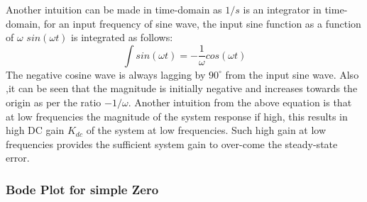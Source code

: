 Another intuition can be made in time-domain as $1/s$ is an integrator in time-domain, for an input frequency of sine wave, the input sine function as a function of $\omega$ $sin(\omega t)$ is integrated as follows:
\begin{equation}
\int sin(\omega t) = -\frac{1}{\omega} cos(\omega t)
\end{equation}
The negative cosine wave is always lagging by $90^{\circ}$ from the input sine wave. Also ,it can be seen that the magnitude is initially negative and increases towards the origin as per the ratio $-1 / \omega$. Another intuition from the above equation is that at low frequencies the magnitude of the system response if high, this results in high DC gain $K_{dc}$ of the system at low frequencies. Such high gain at low frequencies provides the sufficient system gain to over-come the steady-state error.

\subsubsection{Bode Plot for simple Zero}

